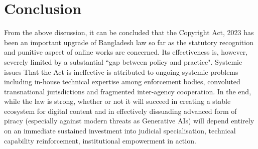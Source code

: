 \documentclass[10pt,letterpaper]{article}
\begin{document}
\section{Conclusion}
From the above discussion, it can be concluded that the Copyright Act, 2023 has been an important upgrade of Bangladesh law so far as the statutory recognition and punitive aspect of online works are concerned. Its effectiveness is, however, severely limited by a substantial ``gap between policy and practice". Systemic issues That the Act is ineffective is attributed to ongoing systemic problems including in-house technical expertise among enforcement bodies, convoluted transnational jurisdictions and fragmented inter-agency cooperation. In the end, while the law is strong, whether or not it will succeed in creating a stable ecosystem for digital content and in effectively dissuading advanced form of piracy (especially against modern threats as Generative AIs) will depend entirely on an immediate sustained investment into judicial specialisation, technical capability reinforcement, institutional empowerment in action.
\end{document}
